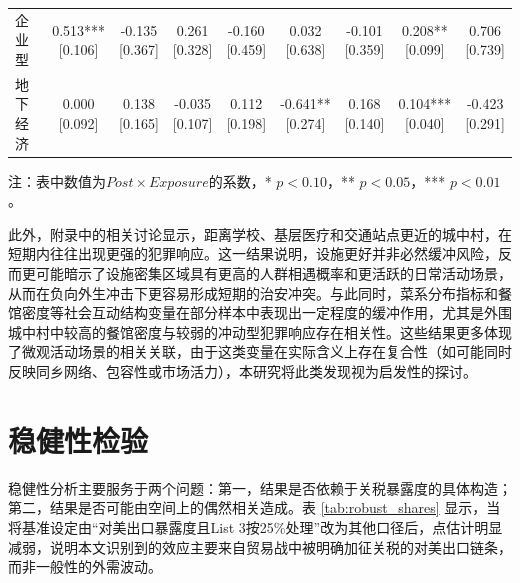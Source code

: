 \documentclass[a4paper,12pt]{report}
\begin{document}
\begin{table}[H]
\begin{adjustbox}{width=\textwidth}
\begin{tabular}{lcccccccc}
企业型 & \makecell{0.513***\\{[0.106]}} & \makecell{-0.135\\{[0.367]}} & \makecell{0.261\\{[0.328]}} & \makecell{-0.160\\{[0.459]}} & \makecell{0.032\\{[0.638]}} & \makecell{-0.101\\{[0.359]}} & \makecell{0.208**\\{[0.099]}} & \makecell{0.706\\{[0.739]}} \\
地下经济 & \makecell{0.000\\{[0.092]}} & \makecell{0.138\\{[0.165]}} & \makecell{-0.035\\{[0.107]}} & \makecell{0.112\\{[0.198]}} & \makecell{-0.641**\\{[0.274]}} & \makecell{0.168\\{[0.140]}} & \makecell{0.104***\\{[0.040]}} & \makecell{-0.423\\{[0.291]}} \\
\bottomrule
\end{tabular}
\end{adjustbox}
\vspace{0.2cm}

\par\raggedright{} 注：表中数值为$Post\times Exposure$的系数，* $p<0.10$，** $p<0.05$，*** $p<0.01$。
\end{table}

此外，附录中的相关讨论显示，距离学校、基层医疗和交通站点更近的城中村，在短期内往往出现更强的犯罪响应。这一结果说明，设施更好并非必然缓冲风险，反而更可能暗示了设施密集区域具有更高的人群相遇概率和更活跃的日常活动场景，从而在负向外生冲击下更容易形成短期的治安冲突。与此同时，菜系分布指标和餐馆密度等社会互动结构变量在部分样本中表现出一定程度的缓冲作用，尤其是外围城中村中较高的餐馆密度与较弱的冲动型犯罪响应存在相关性。这些结果更多体现了微观活动场景的相关关联，由于这类变量在实际含义上存在复合性（如可能同时反映同乡网络、包容性或市场活力），本研究将此类发现视为启发性的探讨。

\section{稳健性检验}
稳健性分析主要服务于两个问题：第一，结果是否依赖于关税暴露度的具体构造；第二，结果是否可能由空间上的偶然相关造成。表 \ref{tab:robust_shares} 显示，当将基准设定由“对美出口暴露度且List 3按25\%处理”改为其他口径后，点估计明显减弱，说明本文识别到的效应主要来自贸易战中被明确加征关税的对美出口链条，而非一般性的外需波动。
\end{document}
